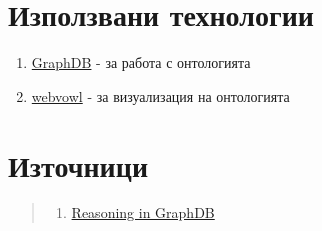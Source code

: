 \documentclass[12pt]{article}
\begin{document}
\section{Използвани технологии}

    \begin{enumerate}
    
    \item \href{https://ontotext.com/products/graphdb/}{GraphDB} - за работа с онтологията
    \item \href{http://vowl.visualdataweb.org/webvowl-old/webvowl-old.html}{webvowl} - за визуализация на онтологията
        
    \end{enumerate}

    




\listoffigures

\section{Източници}

\begin{quote}

    \begin{enumerate}
    
    \item \href{https://graphdb.ontotext.com/documentation/10.2/reasoning.html}{Reasoning in GraphDB}
        
    \end{enumerate}

\end{quote}
\end{document}

